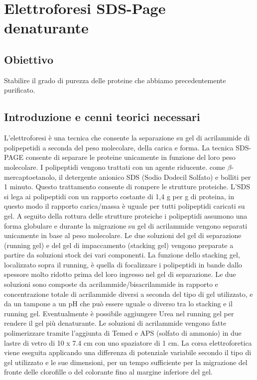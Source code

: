\documentclass{extarticle}
\begin{document}
\newpage
\section{Elettroforesi SDS-Page denaturante}
\subsection*{Obiettivo}
Stabilire il grado di purezza delle proteine che abbiamo precedentemente  purificato.
\subsection*{Introduzione e cenni teorici necessari}
L'elettroforesi è una tecnica che consente la separazione su gel di acrilammide di polipepetidi a seconda del peso molecolare, della carica e forma. La tecnica SDS-PAGE consente di separare le proteine unicamente in funzione del loro peso molecolare. I polipeptidi vengono trattati con un agente riducente. come $\beta$-mercaptoetanolo, il detergente anionico SDS (Sodio Dodecil Solfato) e bolliti per 1 minuto. Questo trattamento consente di rompere le strutture proteiche. L'SDS si lega ai polipeptidi con un rapporto costante di 1,4 g per g di proteina, in questo modo il rapporto carica/massa è uguale per tutti polipeptidi caricati su gel. A seguito della rottura delle strutture proteiche i polipeptidi assumono una forma globulare e durante la migrazione su gel di acrilammide vengono separati unicamente in base al peso molecolare.
Le due soluzioni del gel di separazione (running gel) e del gel di impaccamento (stacking gel) vengono preparate a partire da soluzioni stock dei vari componenti. La funzione dello stacking gel, localizzato sopra il running, è quella di focalizzare i polipeptidi in bande dallo spessore molto ridotto prima del loro ingresso nel gel di separazione. Le due soluzioni sono composte da acrilammide/bisacrilammide in rapporto e concentrazione totale di acrilammide diversi a seconda del tipo di gel utilizzato, e da un tampone a un pH che può essere uguale o diverso tra lo stacking e il running gel. Eventualmente è possibile aggiungere Urea nel running gel per rendere il gel più denaturante.  
Le soluzioni di acrilammide vengono fatte polimerizzare tramite l'aggiunta di Temed e APS (solfato di ammonio) in due lastre di vetro di 10 x 7.4 cm con uno spaziatore di 1 cm.
La corsa elettroforetica viene eseguita applicando una differenza di potenziale variabile secondo il tipo di gel utilizzato e le sue dimensioni, per un tempo sufficiente per la migrazione del fronte delle clorofille o del colorante fino al margine inferiore del gel.
\end{document}
